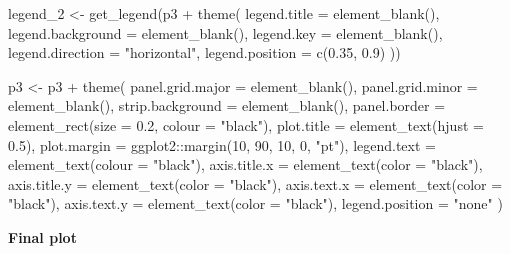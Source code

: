\documentclass[
  11pt,
  oneside]{book}
\newenvironment{Shaded}{\begin{snugshade}}{\end{snugshade}}
\newcommand{\AttributeTok}[1]{\textcolor[rgb]{0.77,0.63,0.00}{#1}}
\newcommand{\DecValTok}[1]{\textcolor[rgb]{0.00,0.00,0.81}{#1}}
\newcommand{\FloatTok}[1]{\textcolor[rgb]{0.00,0.00,0.81}{#1}}
\newcommand{\FunctionTok}[1]{\textcolor[rgb]{0.00,0.00,0.00}{#1}}
\newcommand{\NormalTok}[1]{#1}
\newcommand{\OtherTok}[1]{\textcolor[rgb]{0.56,0.35,0.01}{#1}}
\newcommand{\SpecialCharTok}[1]{\textcolor[rgb]{0.00,0.00,0.00}{#1}}
\newcommand{\StringTok}[1]{\textcolor[rgb]{0.31,0.60,0.02}{#1}}
\begin{document}
\begin{Shaded}
\begin{Highlighting}[]
\NormalTok{legend\_2 }\OtherTok{\textless{}{-}} \FunctionTok{get\_legend}\NormalTok{(p3 }\SpecialCharTok{+}
  \FunctionTok{theme}\NormalTok{(}
    \AttributeTok{legend.title =} \FunctionTok{element\_blank}\NormalTok{(),}
    \AttributeTok{legend.background =} \FunctionTok{element\_blank}\NormalTok{(),}
    \AttributeTok{legend.key =} \FunctionTok{element\_blank}\NormalTok{(),}
    \AttributeTok{legend.direction =} \StringTok{"horizontal"}\NormalTok{,}
    \AttributeTok{legend.position =} \FunctionTok{c}\NormalTok{(}\FloatTok{0.35}\NormalTok{, }\FloatTok{0.9}\NormalTok{)}
\NormalTok{  ))}

\NormalTok{p3 }\OtherTok{\textless{}{-}}\NormalTok{ p3 }\SpecialCharTok{+} \FunctionTok{theme}\NormalTok{(}
  \AttributeTok{panel.grid.major =} \FunctionTok{element\_blank}\NormalTok{(),}
  \AttributeTok{panel.grid.minor =} \FunctionTok{element\_blank}\NormalTok{(),}
  \AttributeTok{strip.background =} \FunctionTok{element\_blank}\NormalTok{(),}
  \AttributeTok{panel.border =} \FunctionTok{element\_rect}\NormalTok{(}\AttributeTok{size =} \FloatTok{0.2}\NormalTok{, }\AttributeTok{colour =} \StringTok{"black"}\NormalTok{),}
  \AttributeTok{plot.title =} \FunctionTok{element\_text}\NormalTok{(}\AttributeTok{hjust =} \FloatTok{0.5}\NormalTok{),}
  \AttributeTok{plot.margin =}\NormalTok{ ggplot2}\SpecialCharTok{::}\FunctionTok{margin}\NormalTok{(}\DecValTok{10}\NormalTok{, }\DecValTok{90}\NormalTok{, }\DecValTok{10}\NormalTok{, }\DecValTok{0}\NormalTok{, }\StringTok{"pt"}\NormalTok{),}
  \AttributeTok{legend.text =} \FunctionTok{element\_text}\NormalTok{(}\AttributeTok{colour =} \StringTok{"black"}\NormalTok{),}
  \AttributeTok{axis.title.x =} \FunctionTok{element\_text}\NormalTok{(}\AttributeTok{color =} \StringTok{"black"}\NormalTok{),}
  \AttributeTok{axis.title.y =} \FunctionTok{element\_text}\NormalTok{(}\AttributeTok{color =} \StringTok{"black"}\NormalTok{),}
  \AttributeTok{axis.text.x =} \FunctionTok{element\_text}\NormalTok{(}\AttributeTok{color =} \StringTok{"black"}\NormalTok{),}
  \AttributeTok{axis.text.y =} \FunctionTok{element\_text}\NormalTok{(}\AttributeTok{color =} \StringTok{"black"}\NormalTok{),}
  \AttributeTok{legend.position =} \StringTok{"none"}
\NormalTok{)}
\end{Highlighting}
\end{Shaded}

\textbf{Final plot}
\end{document}
